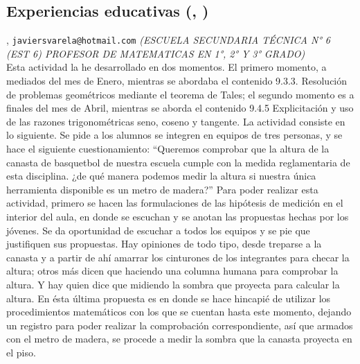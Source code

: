 \subsection{\sffamily Experiencias educativas {\footnotesize (, )}} \label{reg-1824} 
, {\tt javiersvarela@hotmail.com}  {\slshape (ESCUELA SECUNDARIA TÉCNICA N° 6 (EST 6) PROFESOR DE MATEMATICAS EN 1°, 2° Y 3° GRADO)}\\
          \noindent Esta actividad la he desarrollado en dos momentos. El primero momento, a mediados del mes de Enero, mientras se abordaba el contenido 9.3.3. Resolución de problemas geométricos mediante el teorema de Tales; el segundo momento es a finales del mes de Abril, mientras se aborda el contenido 9.4.5 Explicitación y uso de las razones trigonométricas seno, coseno y tangente.   La actividad consiste en lo siguiente. Se pide a los alumnos se integren en equipos de tres personas, y se hace el siguiente cuestionamiento: “Queremos comprobar que la altura de la canasta de basquetbol de nuestra escuela cumple con la medida reglamentaria de esta disciplina. ¿de qué manera podemos medir la altura si nuestra única herramienta disponible es un metro de madera?” Para poder realizar esta actividad, primero se hacen las formulaciones de las hipótesis de medición en el interior del aula, en donde se escuchan y se anotan las propuestas hechas por los jóvenes. Se da oportunidad de escuchar a todos los equipos y se pie que justifiquen sus propuestas. Hay opiniones de todo tipo, desde treparse a la canasta y a partir de ahí amarrar los cinturones de los integrantes para checar la altura; otros más dicen que haciendo una columna humana para comprobar la altura. Y hay quien dice que midiendo la sombra que proyecta para calcular la altura. En ésta última propuesta es en donde se hace hincapié de utilizar los procedimientos matemáticos con los que se cuentan hasta este momento, dejando un registro para poder realizar la comprobación correspondiente, así que armados con el metro de madera, se procede a medir la sombra que la canasta proyecta en el piso.
